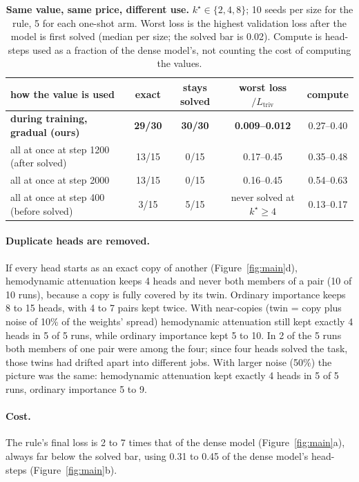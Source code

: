 \documentclass[11pt]{article}
\begin{document}
\begin{table}[h]
\centering
\small
\begin{tabular}{lcccc}
\toprule
how the value is used & exact & stays solved & worst loss$/L_{\text{triv}}$ & compute \\
\midrule
\textbf{during training, gradual (ours)} & \textbf{29/30} & \textbf{30/30} & \textbf{0.009--0.012} & 0.27--0.40 \\
all at once at step 1200 (after solved)  & 13/15 & 0/15 & 0.17--0.45 & 0.35--0.48 \\
all at once at step 2000                 & 13/15 & 0/15 & 0.16--0.45 & 0.54--0.63 \\
all at once at step 400 (before solved)  & 3/15  & 5/15 & never solved at $k^\star \ge 4$ & 0.13--0.17 \\
\bottomrule
\end{tabular}
\caption{\textbf{Same value, same price, different use.} $k^\star \in \{2, 4, 8\}$; 10 seeds per size
for the rule, 5 for each one-shot arm. Worst loss is the highest validation loss after the model is
first solved (median per size; the solved bar is 0.02). Compute is head-steps used as a fraction of the dense model's, not counting the cost of computing the values.}
\label{tab:oneshot}
\end{table}

\paragraph{Duplicate heads are removed.} If every head starts as an exact copy of another
(Figure~\ref{fig:main}d), hemodynamic attenuation keeps 4 heads and never both members of a pair
(10 of 10 runs), because a copy is fully covered by its twin. Ordinary importance keeps 8 to 15
heads, with 4 to 7 pairs kept twice. With near-copies (twin = copy plus noise of 10\% of the
weights' spread) hemodynamic attenuation still kept exactly 4 heads in 5 of 5 runs, while ordinary
importance kept 5 to 10. In 2 of the 5 runs both members of one pair were among the four; since
four heads solved the task, those twins had drifted apart into different jobs. With larger noise (50\%) the picture was the same: hemodynamic attenuation kept exactly 4 heads in 5 of 5 runs, ordinary importance 5 to 9.

\paragraph{Cost.} The rule's final loss is 2 to 7 times that of the dense model (Figure~\ref{fig:main}a),
always far below the solved bar, using 0.31 to 0.45 of the dense model's head-steps
(Figure~\ref{fig:main}b).
\end{document}
